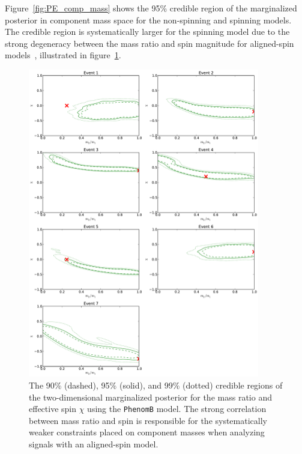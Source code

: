 \documentclass[12pt]{iopart}
\newcommand{\imr}{\texttt{PhenomB}\xspace}
\begin{document}
Figure~\ref{fig:PE_comp_mass} shows the 95\% credible region of the
marginalized posterior in component mass space for the non-spinning and
spinning models.  The credible region is systematically larger for the spinning
model due to the strong degeneracy between the mass ratio and spin magnitude
for aligned-spin models~\cite{Baird:2012cu,Hannam:2013uu}, illustrated in
figure~\ref{fig:PE_q_chi}.

\begin{figure}[t]
  \includegraphics[width=0.9\textwidth]{figure7} 
  \caption{\label{fig:PE_q_chi} The 90\% (dashed), 95\% (solid), and 99\%
      (dotted) credible regions of the two-dimensional marginalized posterior
      for the mass ratio and effective spin $\chi$ using the \imr model.  The
      strong correlation between mass ratio and spin is responsible for the
      systematically weaker constraints placed on component masses when
      analyzing signals with an aligned-spin model.}
\end{figure} 
\end{document}
